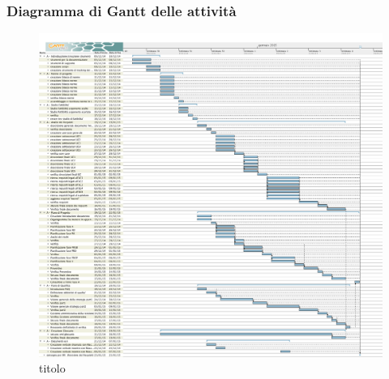 	\subsubsection{Diagramma di Gantt delle attività}
	\begin{figure}\centering
		\includegraphics[scale=0.27]{PianoDiProgetto/Pics/FaseA.png}
	\caption{titolo}
\end{figure}

